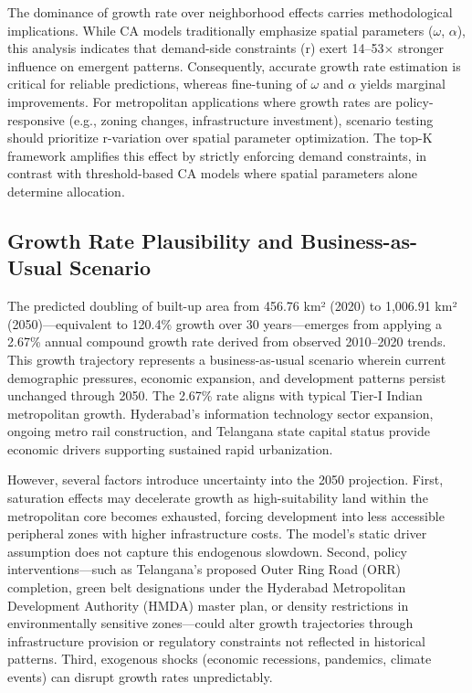 \documentclass[12pt,a4paper]{article}
\begin{document}
The dominance of growth rate over neighborhood effects carries methodological implications. While CA models traditionally emphasize spatial parameters ($\omega$, $\alpha$), this analysis indicates that demand-side constraints (r) exert 14--53$\times$ stronger influence on emergent patterns. Consequently, accurate growth rate estimation is critical for reliable predictions, whereas fine-tuning of $\omega$ and $\alpha$ yields marginal improvements. For metropolitan applications where growth rates are policy-responsive (e.g., zoning changes, infrastructure investment), scenario testing should prioritize r-variation over spatial parameter optimization. The top-K framework amplifies this effect by strictly enforcing demand constraints, in contrast with threshold-based CA models where spatial parameters alone determine allocation.

\subsection{Growth Rate Plausibility and Business-as-Usual Scenario}

The predicted doubling of built-up area from 456.76 km² (2020) to 1,006.91 km² (2050)—equivalent to 120.4\% growth over 30 years—emerges from applying a 2.67\% annual compound growth rate derived from observed 2010--2020 trends. This growth trajectory represents a business-as-usual scenario wherein current demographic pressures, economic expansion, and development patterns persist unchanged through 2050. The 2.67\% rate aligns with typical Tier-I Indian metropolitan growth.  Hyderabad's information technology sector expansion, ongoing metro rail construction, and Telangana state capital status provide economic drivers supporting sustained rapid urbanization.

However, several factors introduce uncertainty into the 2050 projection. First, saturation effects may decelerate growth as high-suitability land within the metropolitan core becomes exhausted, forcing development into less accessible peripheral zones with higher infrastructure costs. The model's static driver assumption does not capture this endogenous slowdown. Second, policy interventions—such as Telangana's proposed Outer Ring Road (ORR) completion, green belt designations under the Hyderabad Metropolitan Development Authority (HMDA) master plan, or density restrictions in environmentally sensitive zones—could alter growth trajectories through infrastructure provision or regulatory constraints not reflected in historical patterns. Third, exogenous shocks (economic recessions, pandemics, climate events) can disrupt growth rates unpredictably.
\end{document}
